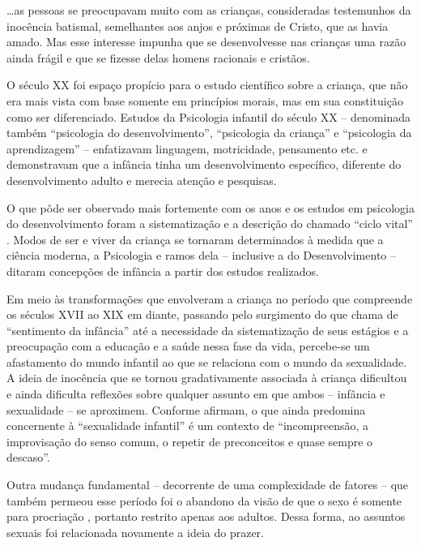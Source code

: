 \begin{citacao}
	\ldots as pessoas se preocupavam muito com as crianças, consideradas testemunhos da inocência batismal, semelhantes aos anjos e próximas de Cristo, que as havia amado. Mas esse interesse impunha que se desenvolvesse nas crianças uma razão ainda frágil e que se fizesse delas homens racionais e cristãos.
\end{citacao}

O século XX foi espaço propício para o estudo científico sobre a criança, que não era mais vista com base somente em princípios morais, mas em sua constituição como ser diferenciado. Estudos da Psicologia infantil do século XX -- denominada também ``psicologia do desenvolvimento'', ``psicologia da criança'' e ``psicologia da aprendizagem'' -- enfatizavam linguagem, motricidade, pensamento etc. \cite[p. 643]{ALMEIDA2004} e demonstravam que a infância tinha um desenvolvimento específico, diferente do desenvolvimento adulto e merecia atenção e pesquisas.

O que pôde ser observado mais fortemente com os anos e os estudos em psicologia do desenvolvimento foram a sistematização e a descrição do chamado ``ciclo vital'' \cite[p. 20]{CASTRO1998}. Modos de ser e viver da criança se tornaram determinados à medida que a ciência moderna, a Psicologia e ramos dela -- inclusive a do Desenvolvimento -- ditaram concepções de infância a partir dos estudos realizados.

Em meio às transformações que envolveram a criança no período que compreende os séculos XVII ao XIX em diante, passando pelo surgimento do que  chama de ``sentimento da infância'' até a necessidade da sistematização de seus estágios e a preocupação com a educação e a saúde nessa fase da vida, percebe-se um afastamento do mundo infantil ao que se relaciona com o mundo da sexualidade. A ideia de inocência que se tornou gradativamente associada à criança dificultou e ainda dificulta reflexões sobre qualquer assunto em que ambos -- infância e sexualidade -- se aproximem. Conforme  afirmam, o que ainda predomina concernente à ``sexualidade infantil'' é um contexto de ``incompreensão, a improvisação do senso comum, o repetir de preconceitos e quase sempre o descaso''.

Outra mudança fundamental -- decorrente de uma complexidade de fatores -- que também permeou esse período foi o abandono da visão de que o sexo é somente para procriação \cite[n.p.]{REZENDE2008}, portanto restrito apenas aos adultos. Dessa forma, ao assuntos sexuais foi relacionada novamente a ideia do prazer. 

